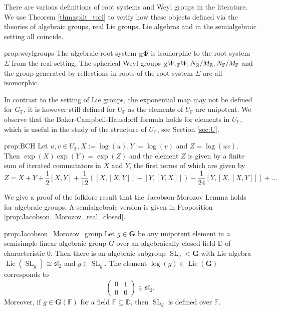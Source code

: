 \documentclass[12pt]{amsart}
\newcommand{\F}{\mathbb{F} }
\newcommand{\R}{\mathbb{R} }
\newcommand{\D}{\mathbb{D} }
\newcommand{\K}{\mathbb{K}}
\newcommand{\bG}{\mathbf{G}}
\newcommand{\KPhi}{\vphantom{\Phi}_{\K}\Phi}
\newcommand{\KW}{\vphantom{W}_{\K}W}
\newcommand{\FW}{\vphantom{W}_{\F}W}
\numberwithin{equation}{section}
\theoremstyle{remark} %
\begin{document}
	 
	 
	 There are various definitions of root systems and Weyl groups in the literature. We use Theorem \ref{thm:split_tori} to verify how these objects defined via the theories of algebraic groups, real Lie groups, Lie algebras and in the semialgebraic setting all coincide. 
	 \begin{repproposition}{prop:weylgroups}
	 	The algebraic root system $\KPhi$ is isomorphic to the root system $\Sigma$ from the real setting. The spherical Weyl groups $\KW, \FW, N_\R/M_\R, N_\F/M_\F$ and the group generated by reflections in roots of the root system $\Sigma$ are all isomorphic. 
	 \end{repproposition}
	
	
	
	In contrast to the setting of Lie groups, the exponential map may not be defined for $G_\F$, it is however still defined for $U_\F$ as the elements of $U_\F$ are unipotent. We observe that the Baker-Campbell-Hausdorff formula holds for elements in $U_\F$, which is useful in the study of the structure of $U_\F$, see Section \ref{sec:U}. 
	
	\begin{repproposition}{prop:BCH}
		Let $u,v \in U_\F, X := \log(u), Y:= \log(v)$ and $Z = \log(uv)$. Then $\exp(X)\exp(Y) = \exp(Z)$ and the element $Z$ is given by a finite sum of iterated commutators in $X$ and $Y$, the first terms of which are given by
		$$
		Z = X + Y + \frac{1}{2}[X,Y] + \frac{1}{12}\left(\left[X,\left[X,Y\right]\right]- \left[Y, \left[Y,X\right]\right]\right) - \frac{1}{24} \left[Y,\left[X,\left[X,Y\right]\right]\right] + \ldots
		$$ 
	\end{repproposition}
	

	
	
	We give a proof of the folklore result that the Jacobson-Morozov Lemma holds for algebraic groups. A semialgebraic version is given in Proposition \ref{prop:Jacobson_Morozov_real_closed}.
	\begin{repproposition}{prop:Jacobson_Morozov_group}
		Let $g\in \bG$ be any unipotent element in a semisimple linear algebraic group $G$ over an algebraically closed field $\D$ of characteristic $0$. Then there is an algebraic subgroup $\operatorname{SL}_g < \bG$ with Lie algebra $\operatorname{Lie}(\operatorname{SL}_g) \cong \mathfrak{sl}_2$ and $g \in \operatorname{SL}_g$. The element $\log(g) \in \operatorname{Lie}(\bG)$ corresponds to %
		$$
		\begin{pmatrix}
			0 & 1 \\ 0 & 0
		\end{pmatrix}\in \mathfrak{sl}_2.
		$$
		Moreover, if $g\in \bG(\F)$ for a field $\F \subseteq \D$, then $\operatorname{SL}_g$ is defined over $\F$. 
	\end{repproposition} 
	
\end{document}
